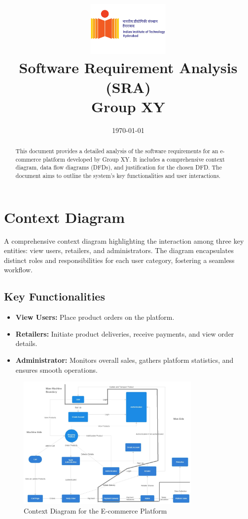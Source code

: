 \documentclass[a4paper,12pt]{article}
\title{\vspace{-2cm} \includegraphics[width=0.3\textwidth]{iith_logo.png} \\[1cm] Software Requirement Analysis (SRA) \\ Group XY}
\date{\today}
\begin{document}
\maketitle

\begin{abstract}
    This document provides a detailed analysis of the software requirements for an e-commerce platform developed by Group XY. It includes a comprehensive context diagram, data flow diagrams (DFDs), and justification for the chosen DFD. The document aims to outline the system's key functionalities and user interactions.
\end{abstract}

\newpage
\tableofcontents
\newpage


\section{Context Diagram}

A comprehensive context diagram highlighting the interaction among three key entities: view users, retailers, and administrators. The diagram encapsulates distinct roles and responsibilities for each user category, fostering a seamless workflow.

\subsection{Key Functionalities}

\begin{itemize}
  \item \textbf{View Users:} Place product orders on the platform.
  \item \textbf{Retailers:} Initiate product deliveries, receive payments, and view order details.
  \item \textbf{Administrator:} Monitors overall sales, gathers platform statistics, and ensures smooth operations.
\end{itemize}

\begin{figure}[H]
    \centering
    \includegraphics[width=0.8\textwidth]{dfd1.jpg}
    \caption{Context Diagram for the E-commerce Platform}
\end{figure}
\end{document}
